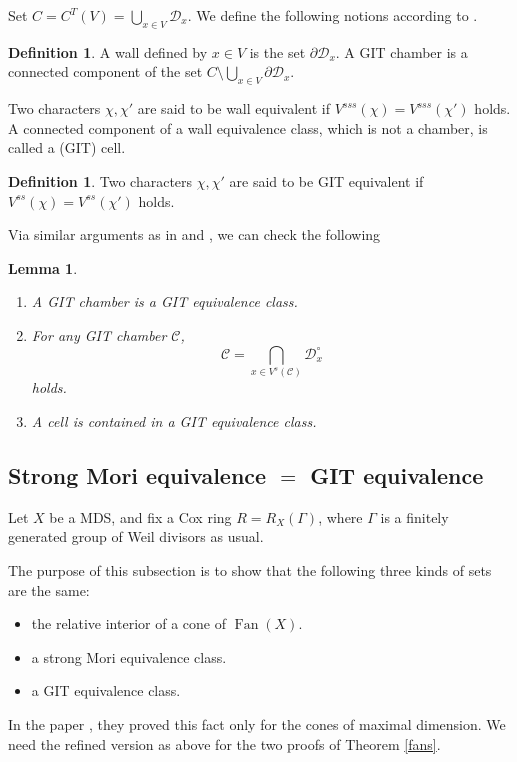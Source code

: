 \documentclass[12pt,twoside]{amsart}
\newtheorem{lem}[theo]{Lemma}
\theoremstyle{definition}
\newtheorem{defi}[theo]{Definition}
\newcommand\Fan{\mathop{\mathrm{Fan}}}
\begin{document}
Set $C=C^{T}(V)=\bigcup_{x\in V}\mathcal{D}_x$. 
We define the following notions according to \cite{dh}.
\begin{defi}
A wall defined by $x\in V$ is the set $\partial\mathcal{D}_x$.
A GIT chamber is a connected component of the set
$C\setminus\bigcup_{x\in V}\partial\mathcal{D}_x$.

Two characters $\chi,\chi'$ are said to be wall equivalent if
$V^{sss}(\chi)=V^{sss}(\chi')$ holds. 
A connected component
of a wall equivalence class, which is not a chamber, is called
a (GIT) cell.

\end{defi}

\begin{defi}\label{VGIT notions}
Two characters $\chi,\chi'$ are said to be GIT equivalent
if $V^{ss}(\chi)=V^{ss}(\chi')$ holds.
\end{defi}


Via similar arguments as in \cite[Theorem 3.3.2]{dh} and \cite[Lemma 3.3.10]{dh},
we can check the following
\begin{lem}\label{VGIT lemmas}
\begin{enumerate}
\item A GIT chamber is a GIT equivalence class.
\item For any GIT chamber $\mathcal{C}$,
\begin{equation*}
\mathcal{C}=\bigcap_{x\in V^{s}(\mathcal{C})}\mathcal{D}_{x}^{\circ}
\end{equation*}
holds.
\item A cell is contained in a GIT equivalence class.\label{cell to GIT equivalence}
\end{enumerate}
\end{lem}




\subsection{Strong Mori equivalence $=$ GIT equivalence}
\label{Strong Mori equivalence = GIT equivalence}

Let $X$ be a MDS, and fix a Cox ring $R=R_X(\Gamma)$, where
$\Gamma$ is a finitely generated group of Weil divisors as usual.

The purpose of this subsection is to show that the following three kinds
of sets are the same:
\begin{itemize}
\item the relative interior of a cone of $\Fan{(X)}$.
\item a strong Mori equivalence class.
\item a GIT equivalence class.
\end{itemize}
In the paper \cite{hk}, they proved this fact only for the cones of maximal dimension.  We need the
refined version as above for the two proofs of Theorem \ref{fans}.
\end{document}
